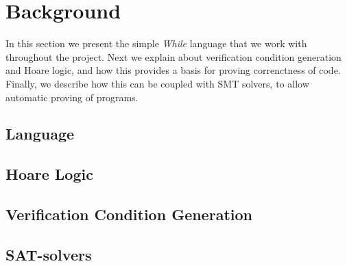 \section{Background}\label{sec:Background}
In this section we present the simple \textit{While} language that we work with throughout the project.
Next we explain about verification condition generation and Hoare logic, and how this provides a basis for proving correnctness of code.
Finally, we describe how this can be coupled with SMT solvers, to allow automatic proving of programs.

\subsection{Language}\label{sec:Language}


\subsection{Hoare Logic}\label{sec:hoare}


\subsection{Verification Condition Generation}\label{sec:vcg}


\subsection{SAT-solvers}

